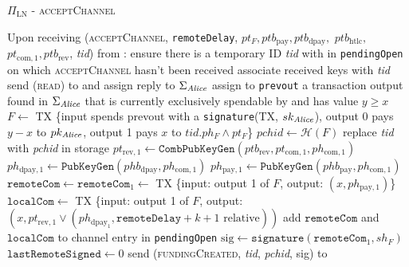 \begin{protocolbox}{$\Pi_{\mathrm{LN}}$ - \textsc{acceptChannel}}
  \label{alg:protocol:open:acceptChannel}
  \begin{algorithmic}[1]
    \State Upon receiving (\textsc{acceptChannel}, \texttt{remoteDelay}, $pt_F,
    ptb_{\mathrm{pay}}, ptb_{\mathrm{dpay}},$ $ptb_{\mathrm{htlc}},$
    $pt_{\mathrm{com}, 1}, ptb_{\mathrm{rev}}$, \textit{tid}) from \bob:
    \Indent
      \State ensure there is a temporary ID \textit{tid} with \bob{} in
      \texttt{pendingOpen} on which \textsc{acceptChannel} hasn't been received
      \State associate received keys with \textit{tid}
      \State send (\textsc{read}) to \ledger{} and assign reply to
      $\Sigma_{\mathit{Alice}}$
      \State assign to \texttt{prevout} a transaction output found in
      $\Sigma_{\mathit{Alice}}$ that is currently exclusively spendable by \alice{} and
      has value $y \geq x$
      \State $F \gets$ TX \{input spends prevout with a \texttt{signature}(TX,
      $sk_{\mathit{Alice}}$), output 0 pays $y - x$ to $pk_{\mathit{Alice}}$, output 1 pays $x$
      to $\textit{tid}.ph_F \wedge pt_F$\}
      \State $\mathit{pchid} \gets \mathcal{H}\left(F\right)$
      \State replace \textit{tid} with \textit{pchid} in storage
      \State $pt_{\mathrm{rev}, 1} \gets
      \mathtt{CombPubKeyGen}\left(ptb_{\mathrm{rev}}, pt_{\mathrm{com}, 1},
      ph_{\mathrm{com}, 1}\right)$
      \State $ph_{\mathrm{dpay}, 1} \gets
      \texttt{PubKeyGen}\left(phb_{\mathrm{dpay}}, ph_{\mathrm{com}, 1}\right)$
      \State $ph_{\mathrm{pay}, 1} \gets
      \texttt{PubKeyGen}\left(phb_{\mathrm{pay}}, ph_{\mathrm{com}, 1}\right)$
      \State $\mathtt{remoteCom} \gets \mathtt{remoteCom}_1 \gets$ TX \{input:
      output 1 of $F$, output: $\left(x, ph_{\mathrm{pay}, 1}\right)$\}
      \State $\mathtt{localCom} \gets$ TX \{input: output 1 of $F$, output:
      $\left(x, pt_{\mathrm{rev}, 1} \vee \left(ph_{\mathrm{dpay}_1},
      \mathtt{remoteDelay} + k + 1 \text{ relative}\right)\right)$
      \State add $\mathtt{remoteCom}$ and $\mathtt{localCom}$ to channel entry
      in \texttt{pendingOpen}
      \State $\mathrm{sig} \gets \mathtt{signature}\left(\mathtt{remoteCom}_1,
      sh_F\right)$
      \State $\mathtt{lastRemoteSigned} \gets 0$
      \State send (\textsc{fundingCreated}, \textit{tid},
      \textit{pchid}, sig) to \bob{}
    \EndIndent
  \end{algorithmic}
\end{protocolbox}

